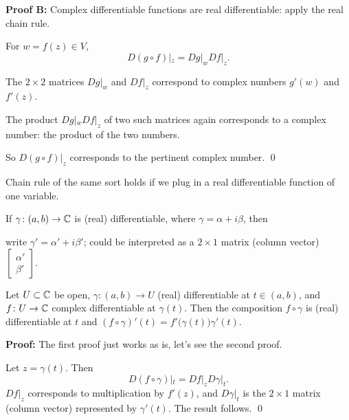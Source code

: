 \documentclass[10pt,aspectratio=169]{beamer}
\begin{document}
\begin{frame}

\textbf{Proof B:}
Complex differentiable functions are real differentiable:
apply the real chain rule.

\medskip
\pause

For $w = f(z) \in V$,
\[
D(g \circ f)|_z = Dg|_w Df|_z .
\]
\pause

The $2 \times 2$ matrices $Dg|_w$ and $Df|_z$ correspond to complex
numbers $g'(w)$ and $f'(z)$.

\medskip
\pause

The product $Dg|_w Df|_z$ of two such matrices again corresponds to a
complex number: the product of the two numbers.

\medskip
\pause

So $D(g \circ f)|_z$ corresponds to the 
pertinent complex number.
\qed
\end{frame}

\begin{frame}
Chain rule of the same sort holds if we plug in a real differentiable function of
one variable.

\medskip
\pause

If $\gamma \colon (a,b) \to {\mathbb{C}}$ is (real) differentiable, where
$\gamma = \alpha + i \beta$, then

\medskip
\pause

write $\gamma' = \alpha' + i \beta'$; could be interpreted as 
a $2 \times 1$ matrix (column vector)
$\left[\begin{smallmatrix}\alpha'\\\beta'\end{smallmatrix}\right]$.

\pause

\begin{proposition}
Let $U \subset {\mathbb{C}}$ be open,
$\gamma \colon (a,b) \to U$ (real) differentiable at $t \in (a,b)$,
and $f \colon U \to {\mathbb{C}}$ complex differentiable at $\gamma(t)$.
Then the composition $f \circ \gamma$ is (real) differentiable
at $t$ and $(f \circ \gamma)'(t) = f'\bigl(\gamma(t)\bigr) \gamma'(t)$.
\end{proposition}

\pause
\textbf{Proof:}
The first proof just works as is, let's see the second proof.

\medskip
\pause

Let $z = \gamma(t)$.  \pause Then 
\[
D(f \circ \gamma)|_{t} =
Df|_z D\gamma|_{t} .
\]
\pause
$Df|_z$ corresponds
to multiplication by $f'(z)$, and $D\gamma|_{t}$
is the $2 \times 1$ matrix (column vector) represented by $\gamma'(t)$.
\pause
The result follows.
\qed
\end{frame}
\end{document}
